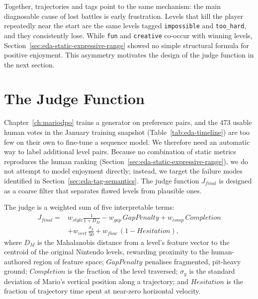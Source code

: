 \documentclass[shortabstract, mgr, english]{iithesis}
\begin{document}
Together, trajectories and tags point to the same mechanism: the main diagnosable cause of lost battles is early frustration. Levels that kill the
player repeatedly near the start are the same levels tagged
\texttt{impossible} and \texttt{too\_hard}, and they consistently lose. While \texttt{fun} and \texttt{creative} co-occur with winning levels,
Section~\ref{sec:eda-static-expressive-range} showed no simple structural formula for positive enjoyment. This asymmetry motivates the design of the judge function in the next
section.

\section{The Judge Function}
\label{sec:dpo-judge}

Chapter~\ref{ch:mariodpo} trains a generator on preference pairs, and
the 473 usable human votes in the January training snapshot
(Table~\ref{tab:eda-timeline}) are too few on their own to fine-tune a sequence model.
We therefore need an automatic way to label additional level pairs. Because no
combination of static metrics reproduces the human ranking
(Section~\ref{sec:eda-static-expressive-range}), we do not attempt to model
enjoyment directly; instead, we target the failure modes identified in
Section~\ref{sec:eda-tag-semantics}. The judge function $J_{final}$ is
designed as a coarse filter that separates flawed levels
from plausible ones.

The judge is a weighted sum of five interpretable terms:
%
\begin{equation}
\label{eq:dpo-j-final}
\begin{aligned}
J_{final} ={} & w_{style}\frac{1}{1 + D_M}
- w_{gap}\,\mathit{GapPenalty}
+ w_{comp}\,\mathit{Completion} \\
& + w_{vert}\,\frac{\sigma_y}{50}
+ w_{flow}\,(1 - \mathit{Hesitation}),
\end{aligned}
\end{equation}
%
where $D_M$ is the Mahalanobis distance from a level's feature vector
to the centroid of the original Nintendo levels, rewarding proximity to the
human-authored region of feature space; $\mathit{GapPenalty}$ penalises
fragmented, pit-heavy ground; $\mathit{Completion}$ is the fraction of the
level traversed; $\sigma_y$ is the standard deviation of Mario's vertical
position along a trajectory; and $\mathit{Hesitation}$ is the fraction of
trajectory time spent at near-zero horizontal velocity.
\end{document}
